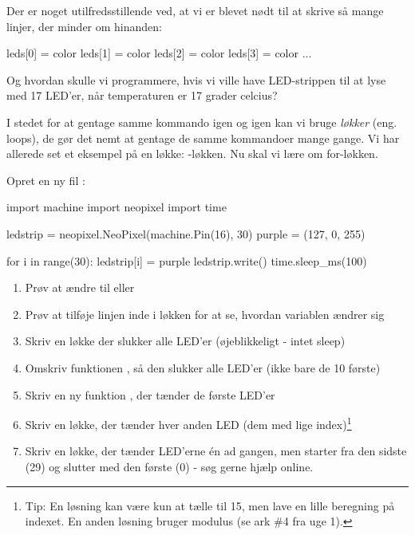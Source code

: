 \documentclass{ucph-handout}
\begin{document}
\begin{exercisebox}[adjusted title=For-løkken]
Der er noget utilfredsstillende ved, at vi er blevet nødt til at
skrive så mange linjer, der minder om hinanden:
\begin{python}
leds[0] = color
leds[1] = color
leds[2] = color
leds[3] = color
...
\end{python}
Og hvordan skulle vi programmere, hvis vi ville have LED-strippen til at lyse med 17
LED'er, når temperaturen er 17 grader celcius?

 I stedet for at gentage samme kommando igen og igen kan vi bruge
\textit{løkker} (eng. loops), de gør det nemt at gentage de samme
kommandoer mange gange. Vi har allerede set et eksempel på en løkke:
-løkken. Nu skal vi lære om for-løkken.

  
Opret en ny fil :
\begin{python}
  import machine
  import neopixel
  import time

  ledstrip = neopixel.NeoPixel(machine.Pin(16), 30)
  purple = (127, 0, 255)

  for i in range(30):
      ledstrip[i] = purple
      ledstrip.write()
      time.sleep_ms(100)
\end{python}

\begin{enumerate}
\item Prøv at ændre  til  eller 
\item Prøv at tilføje linjen  inde i løkken for at se,
  hvordan variablen  ændrer sig
\item Skriv en løkke der slukker alle LED'er (øjeblikkeligt - intet sleep)
\item Omskriv funktionen , så den slukker alle LED'er (ikke bare de 10 første)
\item Skriv en ny funktion , der tænder de
   første LED'er
\item Skriv en løkke, der tænder hver anden LED (dem med lige
  index)\footnote{Tip: En løsning kan være kun at tælle til 15, men
    lave en lille beregning på indexet. En anden løsning bruger
    modulus (se ark \#4 fra uge 1).}
\item Skriv en løkke, der tænder LED'erne én ad gangen, men starter fra
  den sidste (29) og slutter med den første (0) - søg gerne hjælp online.
\end{enumerate}
\end{exercisebox}
\newpage
\hfill
\end{document}
